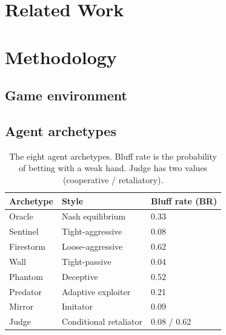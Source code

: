 \documentclass[11pt]{article}
\begin{document}
\section{Related Work}
\label{sec:related}


\section{Methodology}
\label{sec:methods}

\subsection{Game environment}

\subsection{Agent archetypes}
\begin{table}[htbp]
  \centering
  \begin{tabular}{lll}
    \toprule
    Archetype & Style & Bluff rate (BR) \\
    \midrule
    Oracle    & Nash equilibrium     & 0.33 \\
    Sentinel  & Tight-aggressive     & 0.08 \\
    Firestorm & Loose-aggressive     & 0.62 \\
    Wall      & Tight-passive        & 0.04 \\
    Phantom   & Deceptive            & 0.52 \\
    Predator  & Adaptive exploiter   & 0.21 \\
    Mirror    & Imitator             & 0.09 \\
    Judge     & Conditional retaliator & 0.08 / 0.62 \\
    \bottomrule
  \end{tabular}
  \caption{The eight agent archetypes. Bluff rate is the probability of
    betting with a weak hand. Judge has two values (cooperative /
    retaliatory).}
  \label{tab:archetypes}
\end{table}
\end{document}
